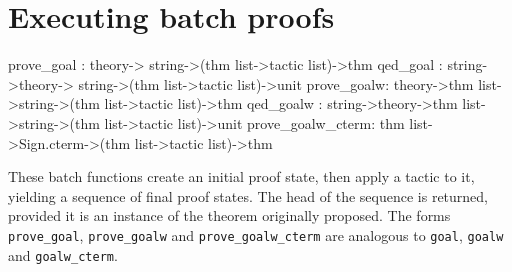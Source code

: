 \section{Executing batch proofs}
\begin{ttbox}
prove_goal :         theory->          string->(thm list->tactic list)->thm
qed_goal   : string->theory->          string->(thm list->tactic list)->unit
prove_goalw:         theory->thm list->string->(thm list->tactic list)->thm
qed_goalw  : string->theory->thm list->string->(thm list->tactic list)->unit
prove_goalw_cterm: thm list->Sign.cterm->(thm list->tactic list)->thm
\end{ttbox}
These batch functions create an initial proof state, then apply a tactic to
it, yielding a sequence of final proof states.  The head of the sequence is
returned, provided it is an instance of the theorem originally proposed.
The forms {\tt prove_goal}, {\tt prove_goalw} and {\tt prove_goalw_cterm}
are analogous to {\tt goal}, {\tt goalw} and {\tt goalw_cterm}.

